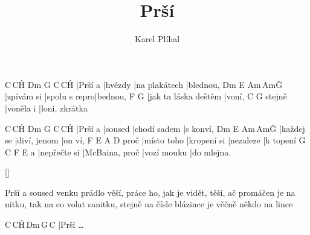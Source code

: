 \documentclass{song}
\title{Prší}
\author{Karel Plíhal}
\begin{document}
C\,C\^H Dm      G             C\,C\^H
|Prší a |hvězdy |na plakátech |blednou,
Dm         E             Am\,Am\^G
|zpívám si |spolu s repro|bednou,
F                    G
|jak ta láska deštěm |voní,
       C         G
stejně |voněla i |loni, zkrátka
\endstrophe

\strophe
C\,C\^H Dm      G            C\,C\^H
|Prší a |soused |chodí sadem |s konví,
Dm         E            Am\,Am\^G
|každej se |diví, jenom |on ví,
     F           E           A         D
proč |místo toho |kropení si |nezaleze |k topení
  G            C              F           E
a |nepřečte si |McBaina, proč |vozí mouku |do mlejna.
\endstrophe

\ref{}

\strophe*
Prší a soused venku prádlo věší,
práce ho, jak je vidět, těší,
ač promáčen je na nitku, tak na co volat sanitku,
stejně na čísle blázince je věčně někdo na lince
\endstrophe

\strophe
C\,C\^H\,Dm\,G\,C
|Prší \ldots
\endstrophe
\end{document}
